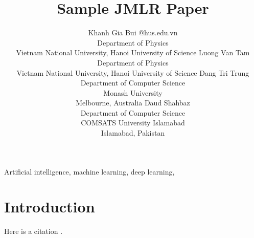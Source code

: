 \documentclass[twoside,11pt]{article}
\begin{document}
\title{Sample JMLR Paper}

\author{\name Khanh Gia Bui @hus.edu.vn \\
       \addr Department of Physics\\
       Vietnam National University, Hanoi University of Science
       \AND
       \name Luong Van Tam \\
       \addr Department of Physics\\
       Vietnam National University, Hanoi University of Science
       \AND
       \name Dang Tri Trung \\
       \addr Department of Computer Science\\
       Monash University \\
       Melbourne, Australia
       \AND 
       \name Daud Shahbaz \\
       \addr Department of Computer Science \\
       COMSATS University Islamabad \\ 
       Islamabad, Pakistan
}

\maketitle

\begin{abstract}%
\blindtext
\end{abstract}

\begin{keywords}
  Artificial intelligence, machine learning, deep learning, 
\end{keywords}

\section{Introduction}

\blindmathpaper

Here is a citation \cite{chow:68}.


\end{document}
